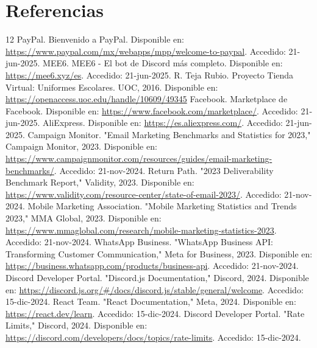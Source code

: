\documentclass[a4paper,12pt]{article}
\begin{document}
\section{Referencias}
\begin{thebibliography}{12}
 PayPal. Bienvenido a PayPal. Disponible en: \url{https://www.paypal.com/mx/webapps/mpp/welcome-to-paypal}. Accedido: 21-jun-2025.
 MEE6. MEE6 - El bot de Discord más completo. Disponible en: \url{https://mee6.xyz/es}. Accedido: 21-jun-2025.
 R. Teja Rubio. Proyecto Tienda Virtual: Uniformes Escolares. UOC, 2016. Disponible en: \url{https://openaccess.uoc.edu/handle/10609/49345}
 Facebook. Marketplace de Facebook. Disponible en: \url{https://www.facebook.com/marketplace/}. Accedido: 21-jun-2025.
 AliExpress. Disponible en: \url{https://es.aliexpress.com/}. Accedido: 21-jun-2025.
 Campaign Monitor. "Email Marketing Benchmarks and Statistics for 2023," Campaign Monitor, 2023. Disponible en: \url{https://www.campaignmonitor.com/resources/guides/email-marketing-benchmarks/}. Accedido: 21-nov-2024.
 Return Path. "2023 Deliverability Benchmark Report," Validity, 2023. Disponible en: \url{https://www.validity.com/resource-center/state-of-email-2023/}. Accedido: 21-nov-2024.
 Mobile Marketing Association. "Mobile Marketing Statistics and Trends 2023," MMA Global, 2023. Disponible en: \url{https://www.mmaglobal.com/research/mobile-marketing-statistics-2023}. Accedido: 21-nov-2024.
 WhatsApp Business. "WhatsApp Business API: Transforming Customer Communication," Meta for Business, 2023. Disponible en: \url{https://business.whatsapp.com/products/business-api}. Accedido: 21-nov-2024.
 Discord Developer Portal. "Discord.js Documentation," Discord, 2024. Disponible en: \url{https://discord.js.org/#/docs/discord.js/stable/general/welcome}. Accedido: 15-dic-2024.
 React Team. "React Documentation," Meta, 2024. Disponible en: \url{https://react.dev/learn}. Accedido: 15-dic-2024.
 Discord Developer Portal. "Rate Limits," Discord, 2024. Disponible en: \url{https://discord.com/developers/docs/topics/rate-limits}. Accedido: 15-dic-2024.
\end{thebibliography}
\end{document}
